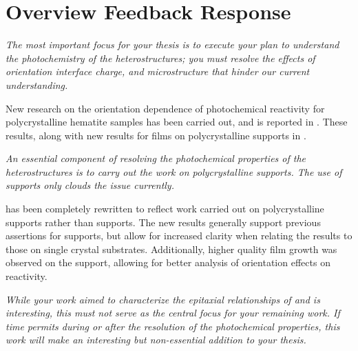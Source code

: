 \documentclass[12pt,%
               letterpaper,
               oneside]{uiothesis}
\begin{document}
  \pagestyle{uio}

\chapter*{Overview Feedback Response}


\begin{enum}
  \item \emph{The most important focus for your thesis is to execute your plan to understand the photochemistry of the heterostructures; you must resolve the effects of orientation interface charge, and microstructure that hinder our current understanding.}\vspace{8pt}
  
	New research on the orientation dependence of photochemical reactivity for polycrystalline hematite samples has been carried out, and is reported in . These results, along with new results for films on polycrystalline  supports in .\vspace{16pt}
  
  \item \emph{An essential component of resolving the photochemical properties of the heterostructures is to carry out the work on polycrystalline  supports. The use of  supports only clouds the issue currently.}\vspace{8pt}
  
   has been completely rewritten to reflect work carried out on polycrystalline  supports rather than  supports. The new results generally support previous assertions for  supports, but allow for increased clarity when relating the results to those on single crystal substrates. Additionally, higher quality film growth was observed on the  support, allowing for better analysis of orientation effects on reactivity.\vspace{16pt}
  
  \item \emph{While your work aimed to characterize the epitaxial relationships of  and  is interesting, this must not serve as the central focus for your remaining work. If time permits during or after the resolution of the photochemical properties, this work will make an interesting but non-essential addition to your thesis.}\vspace{8pt}
  

\end{enum}
\end{document}
